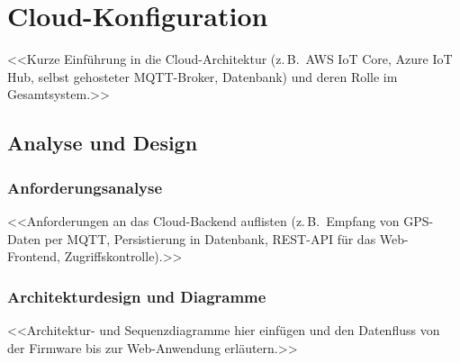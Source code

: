 
\section{Cloud-Konfiguration}
\label{sec:cloud}

<<Kurze Einführung in die Cloud-Architektur (z.\,B.\ AWS IoT Core, Azure IoT Hub,
selbst gehosteter MQTT-Broker, Datenbank) und deren Rolle im Gesamtsystem.>>

\subsection{Analyse und Design}

\subsubsection{Anforderungsanalyse}
<<Anforderungen an das Cloud-Backend auflisten (z.\,B.\ Empfang von GPS-Daten
per MQTT, Persistierung in Datenbank, REST-API für das Web-Frontend,
Zugriffskontrolle).>>

\subsubsection{Architekturdesign und Diagramme}
<<Architektur- und Sequenzdiagramme hier einfügen und den Datenfluss von der
Firmware bis zur Web-Anwendung erläutern.>>


